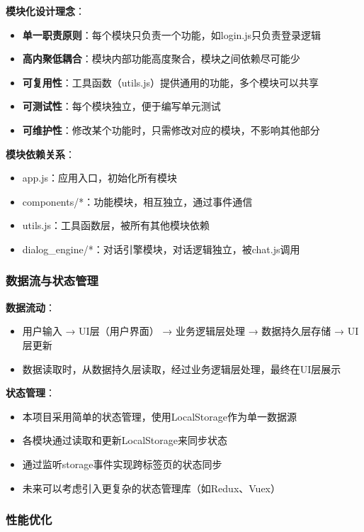 \documentclass[12pt,a4paper]{article}
\begin{document}
\textbf{模块化设计理念}：
\begin{itemize}
    \item \textbf{单一职责原则}：每个模块只负责一个功能，如login.js只负责登录逻辑
    \item \textbf{高内聚低耦合}：模块内部功能高度聚合，模块之间依赖尽可能少
    \item \textbf{可复用性}：工具函数（utils.js）提供通用的功能，多个模块可以共享
    \item \textbf{可测试性}：每个模块独立，便于编写单元测试
    \item \textbf{可维护性}：修改某个功能时，只需修改对应的模块，不影响其他部分
\end{itemize}

\textbf{模块依赖关系}：
\begin{itemize}
    \item app.js：应用入口，初始化所有模块
    \item components/*：功能模块，相互独立，通过事件通信
    \item utils.js：工具函数层，被所有其他模块依赖
    \item dialog\_engine/*：对话引擎模块，对话逻辑独立，被chat.js调用
\end{itemize}

\subsubsection{数据流与状态管理}

\textbf{数据流动}：
\begin{itemize}
    \item 用户输入 → UI层（用户界面） → 业务逻辑层处理 → 数据持久层存储 → UI层更新
    \item 数据读取时，从数据持久层读取，经过业务逻辑层处理，最终在UI层展示
\end{itemize}

\textbf{状态管理}：
\begin{itemize}
    \item 本项目采用简单的状态管理，使用LocalStorage作为单一数据源
    \item 各模块通过读取和更新LocalStorage来同步状态
    \item 通过监听storage事件实现跨标签页的状态同步
    \item 未来可以考虑引入更复杂的状态管理库（如Redux、Vuex）
\end{itemize}

\subsubsection{性能优化}
\end{document}
